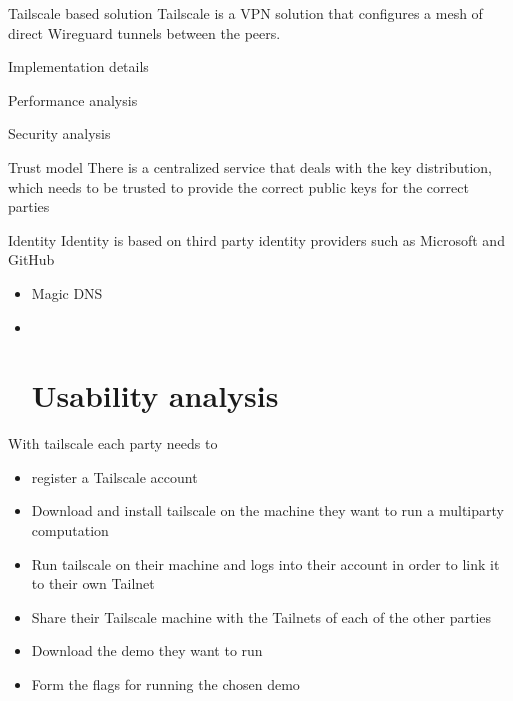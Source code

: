 \hypertarget{thesis__070-tailscale.md}{}
\begin{frame}{Tailscale based solution}
\protect\hypertarget{thesis__070-tailscale.md__tailscale-based-solution}{}
Tailscale is a VPN solution that configures a mesh of direct Wireguard
tunnels between the peers.

\begin{block}{Implementation details}
\protect\hypertarget{thesis__070-tailscale.md__implementation-details}{}
\end{block}

\begin{block}{Performance analysis}
\protect\hypertarget{thesis__070-tailscale.md__performance-analysis}{}
\end{block}

\begin{block}{Security analysis}
\protect\hypertarget{thesis__070-tailscale.md__security-analysis}{}
\begin{block}{Trust model}
\protect\hypertarget{thesis__070-tailscale.md__trust-model}{}
There is a centralized service that deals with the key distribution,
which needs to be trusted to provide the correct public keys for the
correct parties
\end{block}

\begin{block}{Identity}
\protect\hypertarget{thesis__070-tailscale.md__identity}{}
Identity is based on third party identity providers such as Microsoft
and GitHub

\begin{itemize}
\item
  Magic DNS
\item ~
  \hypertarget{thesis__070-tailscale.md__usability-analysis}{%
  \section{Usability
  analysis}\label{thesis__070-tailscale.md__usability-analysis}}
\end{itemize}

With tailscale each party needs to

\begin{itemize}
\tightlist
\item
  register a Tailscale account
\item
  Download and install tailscale on the machine they want to run a
  multiparty computation
\item
  Run tailscale on their machine and logs into their account in order to
  link it to their own Tailnet
\item
  Share their Tailscale machine with the Tailnets of each of the other
  parties
\item
  Download the demo they want to run
\item
  Form the flags for running the chosen demo


\end{itemize}
\end{block}
\end{block}
\end{frame}
